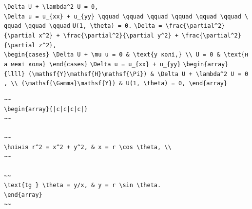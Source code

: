 \documentclass[
  ukrainian,
]{article}
\begin{document}
\texttt{\textbackslash{}Delta\ U\ +\ \textbackslash{}lambda\^{}2\ U\ =\ 0,}
\texttt{\textbackslash{}Delta\ u\ =\ u\_\{xx\}\ +\ u\_\{yy\}\ \textbackslash{}qquad\ \textbackslash{}qquad\ \textbackslash{}qquad\ \textbackslash{}qquad\ \textbackslash{}qquad\ \textbackslash{}qquad\ \textbackslash{}qquad\ \textbackslash{}qquad\ \textbackslash{}qquad}
\texttt{U(1,\ \textbackslash{}theta)\ =\ 0.}
\texttt{\textbackslash{}Delta\ =\ \textbackslash{}frac\{\textbackslash{}partial\^{}2\}\{\textbackslash{}partial\ x\^{}2\}\ +\ \textbackslash{}frac\{\textbackslash{}partial\^{}2\}\{\textbackslash{}partial\ y\^{}2\}\ +\ \textbackslash{}frac\{\textbackslash{}partial\^{}2\}\{\textbackslash{}partial\ z\^{}2\},}
\texttt{\textbackslash{}begin\{cases\}\ \textbackslash{}Delta\ U\ +\ \textbackslash{}mu\ u\ =\ 0\ \&\ \textbackslash{}text\{у\ колі,\}\ \textbackslash{}\textbackslash{}\ U\ =\ 0\ \&\ \textbackslash{}text\{на\ межі\ кола\}\ \textbackslash{}end\{cases\}}
\texttt{\textbackslash{}Delta\ u\ =\ u\_\{xx\}\ +\ u\_\{yy\}}
\texttt{\textbackslash{}begin\{array\}\{llll\}\ (\textbackslash{}mathsf\{Y\}\textbackslash{}mathsf\{H\}\textbackslash{}mathsf\{\textbackslash{}Pi\})\ \&\ \textbackslash{}Delta\ U\ +\ \textbackslash{}lambda\^{}2\ U\ =\ 0,\ \textbackslash{}\textbackslash{}\ (\textbackslash{}mathsf\{\textbackslash{}Gamma\}\textbackslash{}mathsf\{Y\})\ \&\ U(1,\ \textbackslash{}theta)\ =\ 0,\ \textbackslash{}end\{array\}}

\begin{verbatim}
~~
\begin{array}{|c|c|c|c|}
~~

~~
\hлінія r^2 = x^2 + y^2, & x = r \cos \theta, \\
~~

~~
\text{tg } \theta = y/x, & y = r \sin \theta.
\end{array}
~~
\end{verbatim}
\end{document}
